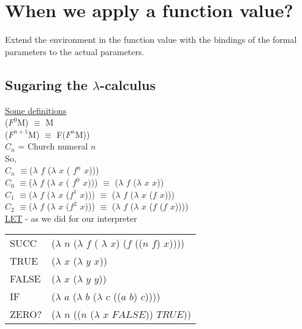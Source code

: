 \documentclass{article}
\begin{document}
\section{When we apply a function value?}
\begin{flushleft}
 Extend the environment in the function value with the bindings of the formal parameters to the actual parameters.
\end{flushleft}
\subsection{Sugaring the $\lambda$-calculus}
\begin{flushleft}
 \underline{Some definitions}\\
 ($F^{0}$M)  $\equiv$ M\\
 ($F^{n+1}$M)  $\equiv$ F($F^{n}$M))\\
 \bigskip
 $C_n$ = Church numeral $\mathit{n}$\\
 \bigskip
 So,\\
 $C_n$ $\equiv$($\lambda$ $\mathit{f}$ ($\lambda$  $\mathit{x}$  ( $f^{n}$  $\mathit{x}$)))\\
 $C_0$ $\equiv$($\lambda$ $\mathit{f}$ ($\lambda$  $\mathit{x}$  ( $f^{0}$  $\mathit{x}$)))  $\equiv$ ($\lambda$ $\mathit{f}$ ($\lambda$  $\mathit{x}$   $\mathit{x}$))\\
 $C_1$ $\equiv$($\lambda$ $\mathit{f}$ ($\lambda$  $\mathit{x}$  ($f^{1}$  $\mathit{x}$)))  $\equiv$ ($\lambda$ $\mathit{f}$ ($\lambda$  $\mathit{x}$  ($\mathit{f}$  $\mathit{x}$)))\\
 $C_2$ $\equiv$($\lambda$ $\mathit{f}$ ($\lambda$  $\mathit{x}$  ($f^{2}$  $\mathit{x}$)))  $\equiv$ ($\lambda$ $\mathit{f}$ ($\lambda$  $\mathit{x}$  ($\mathit{f}$ ($\mathit{f}$  $\mathit{x}$))))\\
 \bigskip
 \underline{LET} - as we did for our interpreter\\
 \begin{tabular}{l l}
  SUCC & ($\lambda$ $\mathit{n}$ ($\lambda$ $\mathit{f}$ ( $\lambda$ $\mathit{x}$) ($\mathit{f}$ (($\mathit{n}$ $\mathit{f}$) $\mathit{x}$))))\\
  TRUE & ($\lambda$ $\mathit{x}$ ($\lambda$ $\mathit{y}$ $\mathit{x}$))\\
  FALSE & ($\lambda$ $\mathit{x}$ ($\lambda$ $\mathit{y}$ $\mathit{y}$))\\
  IF & ($\lambda$ $\mathit{a}$ ($\lambda$ $\mathit{b}$ ($\lambda$ $\mathit{c}$ (($\mathit{a}$ $\mathit{b}$) $\mathit{c}$))))\\
  ZERO? & ($\lambda$ $\mathit{n}$ (($\mathit{n}$ ($\lambda$ $\mathit{x}$ $\mathit{FALSE}$)) $\mathit{TRUE}$))\\
 \end{tabular}
 \end{flushleft}
\pagebreak
\end{document}
